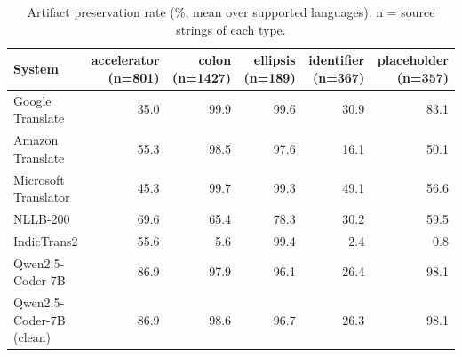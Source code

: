 \begin{table}[t]
\centering
\caption{Artifact preservation rate (\%, mean over supported languages). n = source strings of each type.\label{tab:artifacts}}
\begin{tabular}{lrrrrr}
\toprule
System & accelerator (n=801) & colon (n=1427) & ellipsis (n=189) & identifier (n=367) & placeholder (n=357) \\
\midrule
Google Translate & 35.0 & 99.9 & 99.6 & 30.9 & 83.1 \\
Amazon Translate & 55.3 & 98.5 & 97.6 & 16.1 & 50.1 \\
Microsoft Translator & 45.3 & 99.7 & 99.3 & 49.1 & 56.6 \\
NLLB-200 & 69.6 & 65.4 & 78.3 & 30.2 & 59.5 \\
IndicTrans2 & 55.6 & 5.6 & 99.4 & 2.4 & 0.8 \\
Qwen2.5-Coder-7B & 86.9 & 97.9 & 96.1 & 26.4 & 98.1 \\
Qwen2.5-Coder-7B (clean) & 86.9 & 98.6 & 96.7 & 26.3 & 98.1 \\
\bottomrule
\end{tabular}
\end{table}
